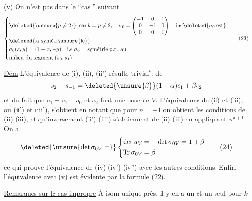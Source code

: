 (v) On n'est pas dans le ``cas  '' suivant 
\[ \left\{\begin{aligned}&\deleted{\unsure{p\ne2}}\ \operatorname{car} k=p\ne2,\quad \sigma_0=\begin{pmatrix}-1&0&1\\0&-1&0\\0&0&1\end{pmatrix}\quad\text{i.e }\deleted{\sigma_0\text{ est}}\\
&\deleted{\text{la symétr}\unsure{\text{ie}}}\\
&\sigma_0(x,y)=(1-x,-y)\quad\text{i.e }\sigma_0=\text{symétrie p.r. au}\\
&\text{milieu du segment }(s_0,s_1)\end{aligned}\right. \tag*{(23)} \]

\uline{Dém} L'équivalence de (i), (ii), (ii') résulte
$\text{trivial}^{t}.$ de
\[ s_2-s_{-1}=\deleted{\unsure{\beta}}(1+\alpha)e_1+\beta e_2 \]
et du fait que $e_1=s_1-s_0$ et $e_2$ font une
base de $V$. L'équivalence de (ii) et (iii),
ou (ii') et (iii'), s'obtient en  notant
que pour $n=-1$ on obtient les conditions de
(ii) (iii), et qu'inversement (ii') (iii') s'obtiennent
de (ii) (iii) en appliquant $u^{n+1}$. On a
\[ \deleted{\unsure{\det\sigma_{0V}=}}\left\{\begin{aligned}\det u_V&=-\det\sigma_{0V}=1+\beta\\
\operatorname{Tr}\sigma_{0V}&=\beta\end{aligned}\right. \tag*{(24)} \]
ce qui prouve l'équivalence de (iv)  (iv') (iv'')
avec les autres conditions. Enfin, l'équivalence
avec (v) est évidente par la 
formule (22).

\uline{Remarques sur le cas impropre} À isom unique
près, il y en a un et un seul pour  $k$
